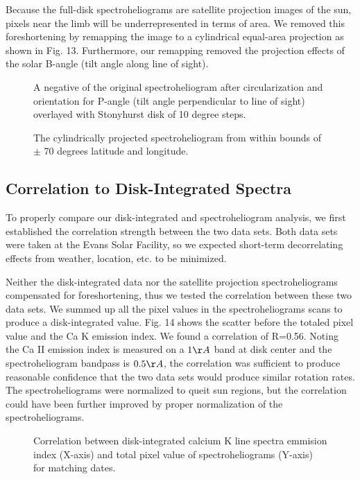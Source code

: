 \documentclass[preprint2]{aastex}
\begin{document}
Because the full-disk spectroheliograms are satellite projection images of the sun, pixels near the limb will be underrepresented in terms of area. We removed this foreshortening by remapping the image to a cylindrical equal-area projection as shown in Fig. 13. Furthermore, our remapping removed the projection effects of the solar B-angle (tilt angle along line of sight).

\begin{figure}[H]
\caption{A negative of the original spectroheliogram after circularization and orientation for P-angle (tilt angle perpendicular to line of sight) overlayed with Stonyhurst disk of 10 degree steps. }
\end{figure}

\begin{figure}[H]
\caption{The cylindrically projected spectroheliogram from within bounds of $\pm$ 70 degrees latitude and longitude.}
\end{figure}

\subsection{Correlation to Disk-Integrated Spectra}

To properly compare our disk-integrated and spectroheliogram analysis, we first established the correlation strength between the two data sets. Both data sets were taken at the Evans Solar Facility, so we expected short-term decorrelating effects from weather, location, etc. to be minimized. 

Neither the disk-integrated data nor the satellite projection spectroheliograms compensated for foreshortening, thus we tested the correlation between these two data sets. We summed up all the pixel values in the spectroheliograms scans to produce a disk-integrated value. Fig. 14 shows the scatter before the totaled pixel value and the Ca K emission index. We found a correlation of R=0.56. Noting the Ca II emission index is measured on a $1\AA$ band at disk center and the spectroheliogram bandpass is $0.5\AA$, the correlation was sufficient to produce reasonable confidence that the two data sets would produce similar rotation rates. The spectroheliograms were normalized to queit sun regions, but the correlation could have been further improved by proper normalization of the spectroheliograms.

\begin{figure}[H]
\caption{Correlation between disk-integrated calcium K line spectra emmision index (X-axis) and total pixel value of spectroheliograms (Y-axis) for matching dates. }
\end{figure}
\end{document}
